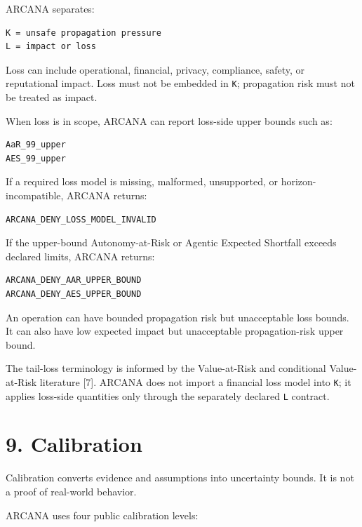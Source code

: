 \documentclass[
  american,
  a4paper,
  10pt]{article}
\begin{document}
ARCANA separates:

\begin{Verbatim}[breaklines=true,breakanywhere=true,fontsize=\small]
K = unsafe propagation pressure
L = impact or loss
\end{Verbatim}

Loss can include operational, financial, privacy, compliance, safety, or reputational
impact. Loss must not be embedded in \texttt{K}; propagation risk must not be treated as
impact.

When loss is in scope, ARCANA can report loss-side upper bounds such as:

\begin{Verbatim}[breaklines=true,breakanywhere=true,fontsize=\small]
AaR_99_upper
AES_99_upper
\end{Verbatim}

If a required loss model is missing, malformed, unsupported, or horizon-incompatible,
ARCANA returns:

\begin{Verbatim}[breaklines=true,breakanywhere=true,fontsize=\small]
ARCANA_DENY_LOSS_MODEL_INVALID
\end{Verbatim}

If the upper-bound Autonomy-at-Risk or Agentic Expected Shortfall exceeds declared
limits, ARCANA returns:

\begin{Verbatim}[breaklines=true,breakanywhere=true,fontsize=\small]
ARCANA_DENY_AAR_UPPER_BOUND
ARCANA_DENY_AES_UPPER_BOUND
\end{Verbatim}

An operation can have bounded propagation risk but unacceptable loss bounds. It can also
have low expected impact but unacceptable propagation-risk upper bound.

The tail-loss terminology is informed by the Value-at-Risk and conditional Value-at-Risk
literature {[}7{]}. ARCANA does not import a financial loss model into \texttt{K}; it
applies loss-side quantities only through the separately declared \texttt{L} contract.

\section{9. Calibration}\label{9-calibration}

Calibration converts evidence and assumptions into uncertainty bounds. It is not a proof
of real-world behavior.

ARCANA uses four public calibration levels:
\end{document}
